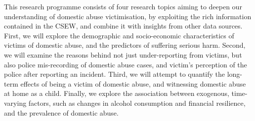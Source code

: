 \documentclass[11pt, a4paper]{article}
\begin{document}



This research programme consists of four research topics aiming to deepen our understanding of domestic abuse victimisation, by exploiting the rich information contained in the CSEW, and combine it with insights from other data sources. First, we will explore the demographic and socio-economic characteristics of victims of domestic abuse, and the predictors of suffering serious harm. Second, we will examine the reasons behind not just under-reporting from victims, but also police mis-recording of domestic abuse cases, and victim's perception of the police after reporting an incident. Third, we will attempt to quantify the long-term effects of being a victim of domestic abuse, and witnessing domestic abuse at home as a child. Finally, we explore the association between exogenous, time-varying factors, such as changes in alcohol consumption and financial resilience, and the prevalence of domestic abuse.
\end{document}
